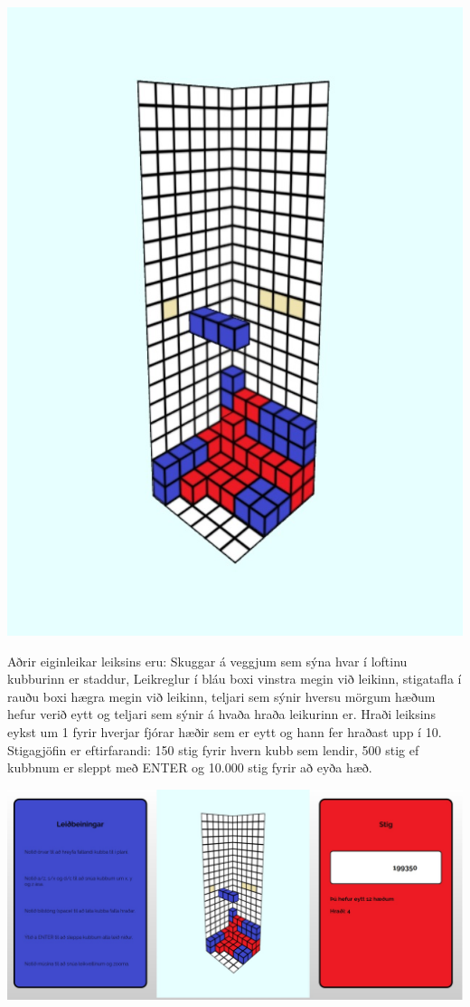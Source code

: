 \documentclass[12pt]{article}
\begin{document}
\begin{small}
\begin{center}
\includegraphics[scale=0.4]{m6}
\end{center}
Aðrir eiginleikar leiksins eru: Skuggar á veggjum sem sýna hvar í loftinu kubburinn er staddur, Leikreglur í bláu boxi vinstra megin við leikinn, stigatafla í rauðu boxi hægra megin við leikinn, teljari sem sýnir hversu mörgum hæðum hefur verið eytt og teljari sem sýnir á hvaða hraða leikurinn er. Hraði leiksins eykst um 1 fyrir hverjar fjórar hæðir sem er eytt og hann fer hraðast upp í 10. Stigagjöfin er eftirfarandi: 150 stig fyrir hvern kubb sem lendir, 500 stig ef kubbnum er sleppt með ENTER og 10.000 stig fyrir að eyða hæð.
\begin{center}
\includegraphics[scale=0.4]{m7}

\end{center}
\end{small}
\end{document}
